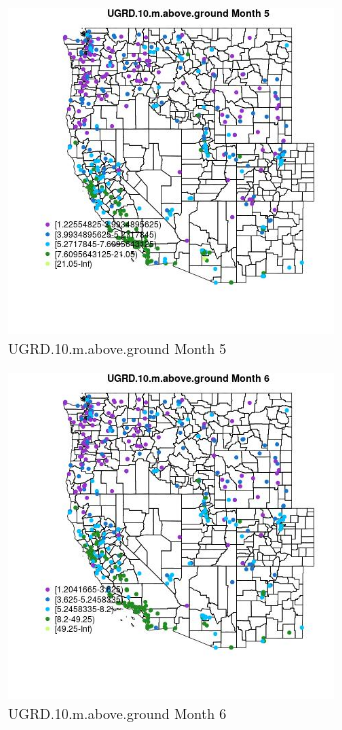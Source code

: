 \begin{figure} 
\centering  
\includegraphics[width=0.77\textwidth]{Code_Outputs/ML_input_report_ML_input_PM25_Step5_part_d_de_duplicated_aves_ML_input_MapObsMo5UGRD10maboveground.jpg} 
\caption{\label{fig:ML_input_report_ML_input_PM25_Step5_part_d_de_duplicated_aves_ML_inputMapObsMo5UGRD10maboveground}UGRD.10.m.above.ground Month 5} 
\end{figure} 
 

\clearpage 

\begin{figure} 
\centering  
\includegraphics[width=0.77\textwidth]{Code_Outputs/ML_input_report_ML_input_PM25_Step5_part_d_de_duplicated_aves_ML_input_MapObsMo6UGRD10maboveground.jpg} 
\caption{\label{fig:ML_input_report_ML_input_PM25_Step5_part_d_de_duplicated_aves_ML_inputMapObsMo6UGRD10maboveground}UGRD.10.m.above.ground Month 6} 
\end{figure} 
 

